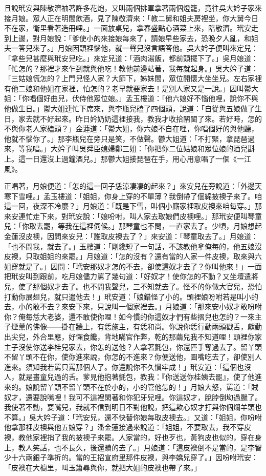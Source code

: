 且說玳安與陳敬濟袖著許多花炮，又叫兩個排軍拿著兩個燈籠，竟往吳大妗子家來接月娘。眾人正在明間飲酒，見了陳敬濟來：「教二舅和姐夫房裡坐，你大舅今日不在家，衛里看著造冊哩。」一面放桌兒，拿春盛點心酒菜上來，陪敬濟。玳安走到上邊，對月娘說：「爹使小的來接娘每來了，請娘早些家去，恐晚夕人亂，和姐夫一答兒來了。」月娘因頭裡惱他，就一聲兒沒言語答他。吳大妗子便叫來定兒：「拿些兒甚麼與玳安兒吃。」來定兒道：「酒肉湯飯，都前頭擺下了。」吳月娘道：「忙怎的？那裡才來乍到就與他吃！教他前邊站著，我每就起身。」吳大妗子道：「三姑娘慌怎的？上門兒怪人家？大節下，姊妹間，眾位開懷大坐坐兒。左右家裡有他二娘和他姐在家裡，怕怎的？老早就要家去！是別人家又是一說。」因叫鬱大姐：「你唱個好曲兒，伏侍他眾位娘。」孟玉樓道：「他六娘好不惱他哩，說你不與他做生日。」鬱大姐連忙下席來，與李瓶兒磕了四個頭，說道：「自從與五娘做了生日，家去就不好起來。昨日妗奶奶這裡接我，教我才收拾䦛䦟了來。若好時，怎的不與你老人家磕頭？」金蓮道：「鬱大姐，你六娘不自在哩，你唱個好的與他聽，他就不惱你了。」那李瓶兒在旁只是笑，不做聲。鬱大姐道：「不打緊，拿琵琶過來，等我唱。」大妗子叫吳舜臣媳婦鄭三姐：「你把你二位姑娘和眾位娘的酒兒斟上。這一日還沒上過鐘酒兒。」那鬱大姐接琵琶在手，用心用意唱了一個《一江風》。

正唱著，月娘便道：「怎的這一回子恁涼凄凄的起來？」來安兒在旁說道：「外邊天寒下雪哩。」孟玉樓道：「姐姐，你身上穿的不單薄？我倒帶了個綿披襖子來了。咱這一回，夜深不冷麼？」月娘道：「既是下雪，叫個小廝家裡取皮襖來咱每穿。」那來安連忙走下來，對玳安說：「娘吩咐，叫人家去取娘們皮襖哩。」那玳安便叫琴童兒：「你取去罷，等我在這裡伺候。」那琴童也不問，一直家去了。少頃，月娘想起金蓮沒皮襖，因問來安兒：「誰取皮襖去了？」來安道：「琴童取去了。」月娘道：「也不問我，就去了。」玉樓道：「剛纔短了一句話，不該教他拿俺每的，他五娘沒皮襖，只取姐姐的來罷。」月娘道：「怎的沒有？還有當的人家一件皮襖，取來與六姐穿就是了。」因問：「玳安那奴才怎的不去，卻使這奴才去了？你叫他來！」一面把玳安叫到跟前，吃月娘儘力罵了幾句道：「好奴才！使你怎的不動？又坐壇遣將兒，使了那個奴才去了。也不問我聲兒，三不知就去了。怪不的你做大官兒，恐怕打動你展翅兒，就只遣他去！」玳安道：「娘錯怪了小的。頭裡娘吩咐若是叫小的去，小的敢不去？來安下來，只說叫一個家裡去。」月娘道：「那來安小奴才敢吩咐你？俺每恁大老婆，還不敢使你哩！如今慣的你這奴才們有些摺兒也怎的？一來主子煙薰的佛像——掛在牆上，有恁施主，有恁和尚。你說你恁行動兩頭戳舌，獻勤出尖兒，外合里應，好懶食饞，背地瞞官作弊，乾的那繭兒我不知道哩！頭裡你家主子沒使你送李桂兒家去，你怎的送他？人拿著氈包，你還匹手奪過去了。留丫頭不留丫頭不在你，使你進來說，你怎的不進來？你便送他，圖嘴吃去了，卻使別人進來。須知我若罵只罵那個人了。你還說你不久慣牢成！」玳安道：「這個也沒人，就是畫童兒過的舌。爹見他抱著氈包，教我：『你送送你桂姨去罷』，使了他進來的。娘說留丫頭不留丫頭不在於小的，小的管他怎的！」月娘大怒，罵道：「賊奴才，還要說嘴哩！我可不這裡閑著和你犯牙兒哩。你這奴才，脫脖倒㘭過颺了。我使著不動，耍嘴兒，我就不信到明日不對他說，把這欺心奴才打與你個爛羊頭也不算。」吳大妗子道：「玳安兒，還不快替你娘每取皮襖去。」又道：「姐姐，你吩咐他拿那裡皮襖與他五娘穿？」潘金蓮接過來說道：「姐姐，不要取去，我不穿皮襖，教他家裡捎了我的披襖子來罷。人家當的，好也歹也，黃狗皮也似的，穿在身上，教人笑話，也不長久，後還贖的去了。」月娘道：「這皮襖倒不是當的，是李智少十六兩銀子準折的。當的王招宣府里那件皮襖，與李嬌兒穿了。」因吩咐玳安：「皮襖在大櫥里，叫玉簫尋與你，就把大姐的皮襖也帶了來。」

